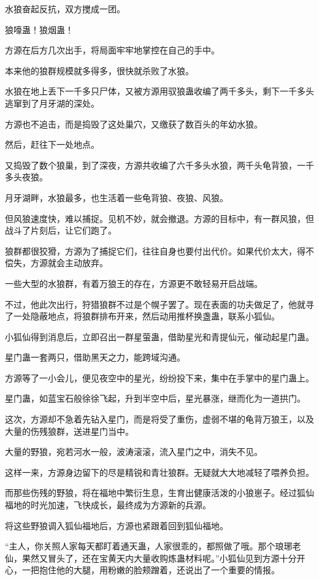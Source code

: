 \begin{this_body}
水狼奋起反抗，双方搅成一团。

狼嚎蛊！狼烟蛊！

方源在后方几次出手，将局面牢牢地掌控在自己的手中。

本来他的狼群规模就多得多，很快就杀败了水狼。

水狼在地上丢下一千多只尸体，又被方源用驭狼蛊收编了两千多头，剩下一千多头逃窜到了月牙湖的深处。

方源也不追击，而是捣毁了这处巢穴，又缴获了数百头的年幼水狼。

然后，赶往下一处地点。

又捣毁了数个狼巢，到了深夜，方源共收编了六千多头水狼，两千头龟背狼，一千多头夜狼。

月牙湖畔，水狼最多，也生活着一些龟背狼、夜狼、风狼。

但风狼速度快，难以捕捉。见机不妙，就会撤退。方源的目标中，有一群风狼，但战斗了片刻后，让它们跑了。

狼群都很狡猾，方源为了捕捉它们，往往自身也要付出代价。如果代价太大，得不偿失，方源就会主动放弃。

一些大型的水狼群，有着万狼王的存在，方源更不敢轻易开启战端。

不过，他此次出行，狩猎狼群不过是个幌子罢了。现在表面的功夫做足了，他就寻了一处隐蔽地点，将狼群排布开来，然后动用推杯换盏蛊，联系小狐仙。

小狐仙得到消息后，立即召出一群星萤蛊，借助星光和青提仙元，催动起星门蛊。

星门蛊一套两只，借助黑天之力，能跨域沟通。

方源等了一小会儿，便见夜空中的星光，纷纷投下来，集中在手掌中的星门蛊上。

星门蛊，如蓝宝石般徐徐飞起，升到半空中后，星光暴涨，继而化为一道拱门。

这次，方源却不急着先钻入星门，而是将受了重伤，虚弱不堪的龟背万狼王，以及大量的伤残狼群，送进星门当中。

大量的野狼，宛若河水一般，波涛滚滚，流入星门之中，消失不见。

这样一来，方源身边留下的尽是精锐和青壮狼群。无疑就大大地减轻了喂养负担。

而那些伤残的野狼，将在福地中繁衍生息，生育出健康活泼的小狼崽子。经过狐仙福地的时光加速，飞快成长，最终成为方源新的兵源。

将这些野狼调入狐仙福地后，方源也紧跟着回到狐仙福地。

“主人，你关照人家每天都盯着通天蛊，人家很乖的，都照做了哦。那个琅琊老仙，果然又冒头了，还在宝黄天内大量收购炼蛊材料呢。”小狐仙见到方源十分开心，一把抱住他的大腿，用粉嫩的脸颊蹭着，还说出了一个重要的情报。


\end{this_body}

